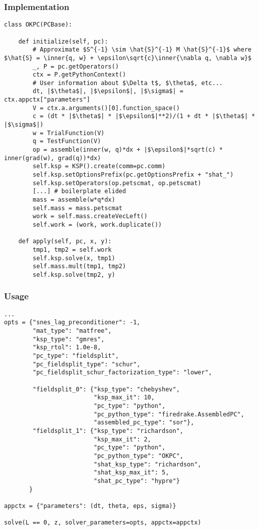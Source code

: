 \documentclass[presentation]{beamer}
\newcommand{\inner}[1]{\left\langle #1 \right \rangle}
\begin{document}
\begin{frame}[fragile]
  \frametitle{Implementation}
\begin{verbatim}
class OKPC(PCBase):

    def initialize(self, pc):
        # Approximate $S^{-1} \sim \hat{S}^{-1} M \hat{S}^{-1}$ where $\hat{S} = \inner{q, w} + \epsilon\sqrt{c}\inner{\nabla q, \nabla w}$
        _, P = pc.getOperators()
        ctx = P.getPythonContext()
        # User information about $\Delta t$, $\theta$, etc...
        dt, |$\theta$|, |$\epsilon$|, |$\sigma$| = ctx.appctx["parameters"]
        V = ctx.a.arguments()[0].function_space()
        c = (dt * |$\theta$| * |$\epsilon$|**2)/(1 + dt * |$\theta$| * |$\sigma$|)
        w = TrialFunction(V)
        q = TestFunction(V)
        op = assemble(inner(w, q)*dx + |$\epsilon$|*sqrt(c) * inner(grad(w), grad(q))*dx)
        self.ksp = KSP().create(comm=pc.comm)
        self.ksp.setOptionsPrefix(pc.getOptionsPrefix + "shat_")
        self.ksp.setOperators(op.petscmat, op.petscmat)
        [...] # boilerplate elided
        mass = assemble(w*q*dx)
        self.mass = mass.petscmat
        work = self.mass.createVecLeft()
        self.work = (work, work.duplicate())

    def apply(self, pc, x, y):
        tmp1, tmp2 = self.work
        self.ksp.solve(x, tmp1)
        self.mass.mult(tmp1, tmp2)
        self.ksp.solve(tmp2, y)
\end{verbatim}
\end{frame}

\begin{frame}[fragile]
  \frametitle{Usage}
\begin{verbatim}
...
opts = {"snes_lag_preconditioner": -1,
        "mat_type": "matfree",
        "ksp_type": "gmres",
        "ksp_rtol": 1.0e-8,
        "pc_type": "fieldsplit",
        "pc_fieldsplit_type": "schur",
        "pc_fieldsplit_schur_factorization_type": "lower",

        "fieldsplit_0": {"ksp_type": "chebyshev",
                         "ksp_max_it": 10,
                         "pc_type": "python",
                         "pc_python_type": "firedrake.AssembledPC",
                         "assembled_pc_type": "sor"},
        "fieldsplit_1": {"ksp_type": "richardson",
                         "ksp_max_it": 2,
                         "pc_type": "python",
                         "pc_python_type": "OKPC",
                         "shat_ksp_type": "richardson",
                         "shat_ksp_max_it": 5,
                         "shat_pc_type": "hypre"}
       }

appctx = {"parameters": (dt, theta, eps, sigma)}

solve(L == 0, z, solver_parameters=opts, appctx=appctx)
\end{verbatim}
\end{frame}
\end{document}
